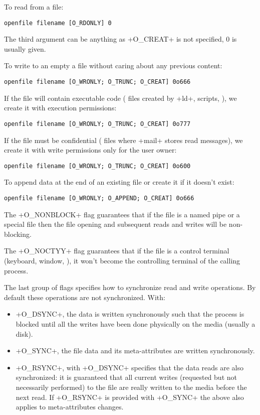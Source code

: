 \pagebreak

\begin{example} 
To read from a file:
%
\begin{lstlisting}
openfile filename [O_RDONLY] 0
\end{lstlisting}
%
The third argument can be anything as \ml+O_CREAT+ is not specified, 0
is usually given.

To write to an empty a file without caring about any previous content:
%
\begin{lstlisting}
openfile filename [O_WRONLY; O_TRUNC; O_CREAT] 0o666
\end{lstlisting}
%
If the file will contain executable code (\eg{} files
created by \ml+ld+, scripts, \etc), we create it with execution permissions:
%
\begin{lstlisting}
openfile filename [O_WRONLY; O_TRUNC; O_CREAT] 0o777
\end{lstlisting}
%
If the file must be confidential (\eg{}  files where
\ml+mail+ stores read messages), we create it with write permissions
only for the user owner:
%
\begin{lstlisting}
openfile filename [O_WRONLY; O_TRUNC; O_CREAT] 0o600
\end{lstlisting}
%
To append data at the end of an existing file or create it if it 
doesn't exist:
%
\begin{lstlisting}
openfile filename [O_WRONLY; O_APPEND; O_CREAT] 0o666
\end{lstlisting}
\end{example}

The \ml+O_NONBLOCK+ flag guarantees that if the file is a named pipe
or a special file then the file opening and subsequent reads and
writes will be non-blocking.

The \ml+O_NOCTYY+ flag guarantees that if the file is a control
terminal (keyboard, window, \etc), it won't become the controlling
terminal of the calling process. 

The last group of flags specifies how to synchronize 
read and write operations. By default these operations are not
synchronized. With:
\begin{itemize}
\item\ml+O_DSYNC+, the data is written synchronously such that
  the process is blocked until all the writes have been done
  physically on the media (usually a disk). 
%
\item\ml+O_SYNC+, the file data and its meta-attributes are written 
  synchronously.
%
\item\ml+O_RSYNC+, with \ml+O_DSYNC+ specifies that the data reads are
  also synchronized: it is guaranteed that all current writes
  (requested but not necessarily performed) to the file are really
  written to the media before the next read.  If \ml+O_RSYNC+ is
  provided with \ml+O_SYNC+ the above also applies to meta-attributes
  changes.
\end{itemize}


